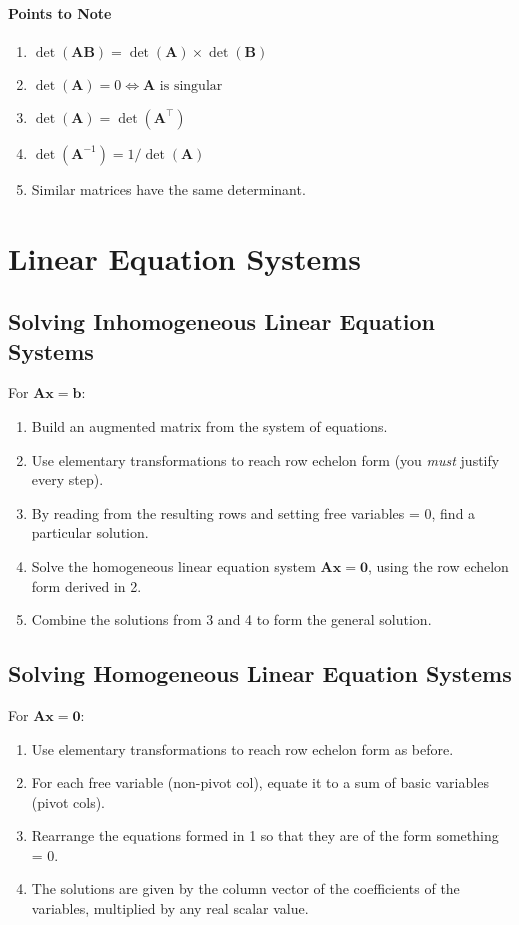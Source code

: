 \documentclass[10pt,twoside,twocolumn]{article}
\begin{document}
\paragraph{Points to Note}
\begin{enumerate}
\item $\det\left(\mathbf{A}\mathbf{B}\right)=\det\left(\mathbf{A}\right)\times\det\left(\mathbf{B}\right)$ 
\item $\det\left(\mathbf{A}\right)=0\iff\mathbf{A}\mbox{ is singular}$ 
\item $\det\left(\mathbf{A}\right)=\det\left(\mathbf{A}^{\top}\right)$ 
\item $\det\left(\mathbf{A}^{-1}\right)=1/\det\left(\mathbf{A}\right)$ 
\item Similar matrices have the same determinant. 
\end{enumerate}

\section{Linear Equation Systems}


\subsection{Solving Inhomogeneous Linear Equation Systems}

For $\mathbf{A}\mathbf{x}=\mathbf{b}$: 
\begin{enumerate}
\item Build an augmented matrix from the system of equations. 
\item Use elementary transformations to reach row echelon form (you \emph{must}
justify every step). 
\item By reading from the resulting rows and setting free variables = 0,
find a particular solution. 
\item Solve the homogeneous linear equation system $\mathbf{A}\mathbf{x}=\mathbf{0}$,
using the row echelon form derived in 2. 
\item Combine the solutions from 3 and 4 to form the general solution. 
\end{enumerate}

\subsection{Solving Homogeneous Linear Equation Systems}

For $\mathbf{A}\mathbf{x}=\mathbf{0}$: 
\begin{enumerate}
\item Use elementary transformations to reach row echelon form as before. 
\item For each free variable (non-pivot col), equate it to a sum of basic
variables (pivot cols). 
\item Rearrange the equations formed in 1 so that they are of the form something
= 0. 
\item The solutions are given by the column vector of the coefficients of
the variables, multiplied by any real scalar value. 
\end{enumerate}
\end{document}
